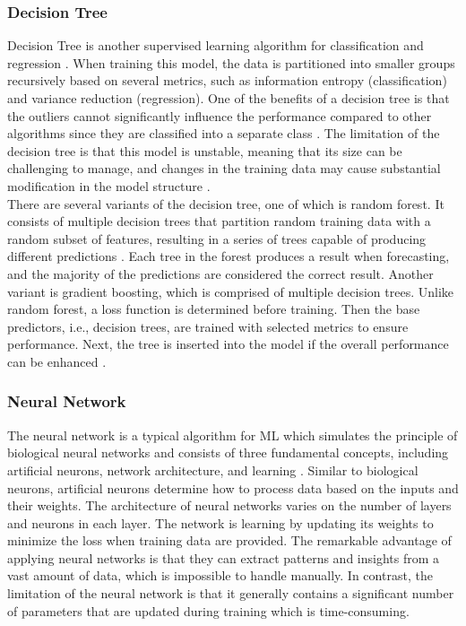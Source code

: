 \documentclass[12pt,twoside]{report}
\begin{document}
\subsubsection{Decision Tree}
Decision Tree is another supervised learning algorithm for classification and regression \citep{RN33}. When training this model,  the data is partitioned into smaller groups recursively based on several metrics, such as information entropy (classification) and variance reduction (regression). One of the benefits of a decision tree is that the outliers cannot significantly influence the performance compared to other algorithms since they are classified into a separate class \citep{RN31}. The limitation of the decision tree is that this model is unstable, meaning that its size can be challenging to manage, and changes in the training data may cause substantial modification in the model structure \citep{RN33}. 
\\

There are several variants of the decision tree, one of which is random forest. It consists of multiple decision trees that partition random training data with a random subset of features, resulting in a series of trees capable of producing different predictions \citep{RN34}. Each tree in the forest produces a result when forecasting, and the majority of the predictions are considered the correct result. Another variant is gradient boosting, which is comprised of multiple decision trees. Unlike random forest, a loss function is determined before training. Then the base predictors, i.e., decision trees, are trained with selected metrics to ensure performance. Next, the tree is inserted into the model if the overall performance can be enhanced \citep{RN35}. 

\subsubsection{Neural Network}
The neural network is a typical algorithm for ML which simulates the principle of biological neural networks and consists of three fundamental concepts, including artificial neurons, network architecture, and learning \citep{RN36}. Similar to biological neurons, artificial neurons determine how to process data based on the inputs and their weights. The architecture of neural networks varies on the number of layers and neurons in each layer. The network is learning by updating its weights to minimize the loss when training data are provided. The remarkable advantage of applying neural networks is that they can extract patterns and insights from a vast amount of data, which is impossible to handle manually. In contrast, the limitation of the neural network is that it generally contains a significant number of parameters that are updated during training which is time-consuming. 
\end{document}
